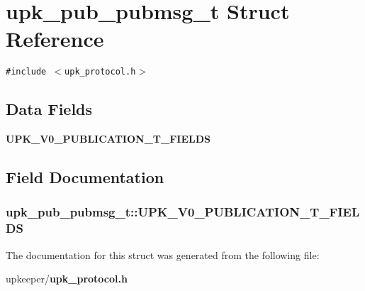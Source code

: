 \section{upk\_\-pub\_\-pubmsg\_\-t Struct Reference}
\label{structupk__pub__pubmsg__t}
{\tt \#include $<$upk\_\-protocol.h$>$}

\subsection*{Data Fields}
\begin{CompactItemize}
\item 
\bf{UPK\_\-V0\_\-PUBLICATION\_\-T\_\-FIELDS}
\end{CompactItemize}


\subsection{Field Documentation}
\subsubsection{\setlength{\rightskip}{0pt plus 5cm}\bf{upk\_\-pub\_\-pubmsg\_\-t::UPK\_\-V0\_\-PUBLICATION\_\-T\_\-FIELDS}}\label{structupk__pub__pubmsg__t_b51d7860f72e754853eb877ab7cb60f9}




The documentation for this struct was generated from the following file:\begin{CompactItemize}
\item 
upkeeper/\bf{upk\_\-protocol.h}\end{CompactItemize}
